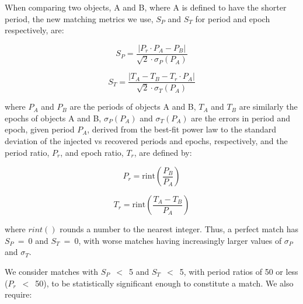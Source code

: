 When comparing two objects, A and B, where A is defined to have the shorter period, the new matching metrics we use, $S_{P}$ and $S_{T}$ for period and epoch respectively, are:

\begin{equation}
    S_{P} = \frac{\left|P_{r} \cdot P_{A} - P_{B}\right|}{\sqrt{2}\cdot\sigma_{P}(P_{A})}
\end{equation}

\begin{equation}
    S_{T} = \frac{\left| T_{A} - T_{B} - T_{r} \cdot P_{A}\right|}{\sqrt{2}\cdot\sigma_{T}(P_{A})}
\end{equation}

\noindent where $P_{A}$ and $P_{B}$ are the periods of objects A and B, $T_{A}$ and $T_{B}$ are similarly the epochs of objects A and B, $\sigma_{P}(P_{A})$ and $\sigma_{T}(P_{A})$ are the errors in period and epoch, given period $P_{A}$, derived from the best-fit power law to the standard deviation of the injected vs recovered periods and epochs, respectively, and the period ratio, $P_{r}$, and epoch ratio, $T_{r}$, are defined by:

\begin{equation}
P_{r} = \textrm{rint}\left(\frac{P_{B}}{P_{A}}\right)
\end{equation}

\begin{equation}
T_{r} = \textrm{rint}\left(\frac{T_{A} - T_{B}}{P_{A}}\right)
\end{equation}


\noindent where $rint()$ rounds a number to the nearest integer. Thus, a perfect match has $S_{P}$~=~0 and  $S_{T}$~=~0, with worse matches having increasingly larger values of $ \sigma_{P}$ and $ \sigma_{T}$. 

We consider matches with $S_{P}$~$<$~5 and $S_{T}$~$<$~5, with period ratios of 50 or less ($P_{r}$~$<$~50), to be statistically significant enough to constitute a match. We also require:


